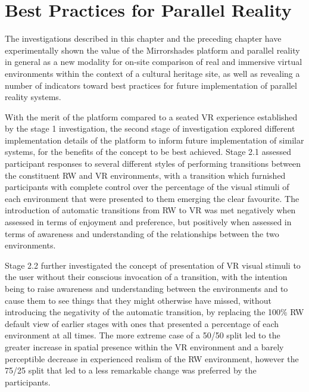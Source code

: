 
\section{Best Practices for Parallel Reality}

The investigations described in this chapter and the preceding chapter have experimentally shown the value of the Mirrorshades platform and parallel reality in general as a new modality for on-site comparison of real and immersive virtual environments within the context of a cultural heritage site, as well as revealing a number of indicators toward best practices for future implementation of parallel reality systems.

With the merit of the platform compared to a seated VR experience established by the stage 1 investigation, the second stage of investigation explored different implementation details of the platform to inform future implementation of similar systems, for the benefits of the concept to be best achieved. Stage 2.1 assessed participant responses to several different styles of performing transitions between the constituent RW and VR environments, with a transition which furnished participants with complete control over the percentage of the visual stimuli of each environment that were presented to them emerging the clear favourite. The introduction of automatic transitions from RW to VR was met negatively when assessed in terms of enjoyment and preference, but positively when assessed in terms of awareness and understanding of the relationships between the two environments.

Stage 2.2 further investigated the concept of presentation of VR visual stimuli to the user without their conscious invocation of a transition, with the intention being to raise awareness and understanding between the environments and to cause them to see things that they might otherwise have missed, without introducing the negativity of the automatic transition, by replacing the 100\% RW default view of earlier stages with ones that presented a percentage of each environment at all times. The more extreme case of a 50/50 split led to the greater increase in spatial presence within the VR environment and a barely perceptible decrease in experienced realism of the RW environment, however the 75/25 split that led to a less remarkable change was preferred by the participants.

